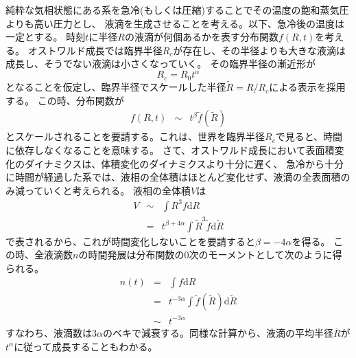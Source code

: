 \documentclass{jarticle}
\newcommand{\diff}{{\mathrm d}}
\begin{document}
純粋な気相状態にある系を急冷(もしくは圧縮)することでその温度の飽和蒸気圧よりも高い圧力とし、
液滴を生成させることを考える。以下、急冷後の温度は一定とする。
時刻$t$に半径$R$の液滴が何個あるかを表す分布関数$f(R,t)$を考える。
オストワルド成長では臨界半径$R_c$が存在し、その半径よりも大きな液滴は成長し、そうでない液滴は小さくなっていく。
その臨界半径の漸近形が
\begin{equation}
    R_c = R_0 t^{\alpha}
\end{equation}
となることを仮定し、臨界半径でスケールした半径$\tilde{R} = R/R_c$による表示を採用する。
この時、分布関数が
\begin{eqnarray}
    f(R,t) &\sim& t^\beta \tilde{f}(\tilde{R})
\end{eqnarray}
とスケールされることを要請する。これは、世界を臨界半径$R_c$で見ると、時間に依存しなくなることを意味する。
さて、オストワルド成長において表面積変化のダイナミクスは、体積変化のダイナミクスより十分に遅く、
急冷から十分に時間が経過した系では、液相の全体積はほとんど変化せず、液滴の全表面積のみ減っていくと考えられる。
液相の全体積$V$は
\begin{eqnarray}
    V &\sim& \int R^3 f \diff R \\
    &=& t^{\beta + 4\alpha} \int \tilde{R}^3 \tilde{f} \diff \tilde{R}
\end{eqnarray}
で表されるから、これが時間変化しないことを要請すると$\beta = -4\alpha$を得る。
この時、全液滴数$n$の時間発展は分布関数の0次のモーメントとして次のように得られる。
\begin{eqnarray}
    n(t) &=& \int f \diff R \\
    &=& t^{-3 \alpha} \int \tilde{f} (\tilde{R}) \diff \tilde{R} \\
    &\sim& t^{-3 \alpha}
\end{eqnarray}
すなわち、液滴数は$3 \alpha$のベキで減衰する。同様な計算から、液滴の平均半径$\bar{R}$が$t^{\alpha}$に従って成長することもわかる。
\end{document}
